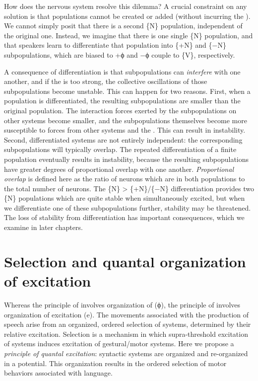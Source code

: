   How does the nervous system resolve this dilemma? A crucial constraint on any solution is that populations cannot be created or added (without incurring the ). We cannot simply posit that there is a second \{N\} population, independent of the original one. Instead, we imagine that there is one single \{N\} population, and that speakers learn to differentiate that population into \{+N\} and \{−N\} subpopulations, which are biased to +ϕ and −ϕ couple to \{V\}, respectively.

  A consequence of differentiation is that subpopulations can \textit{interfere} with one another, and if the  is too strong, the collective oscillations of those subpopulations become unstable. This can happen for two reasons. First, when a population is differentiated, the resulting subpopulations are smaller than the original population. The interaction forces exerted by the subpopulations on other systems become smaller, and the subpopulations themselves become more susceptible to forces from other systems and the . This can result in instability. Second, differentiated systems are not entirely independent: the corresponding subpopulations will typically overlap. The repeated differentiation of a finite population eventually results in instability, because the resulting subpopulations have greater degrees of proportional overlap with one another. \textit{Proportional overlap} is defined here as the ratio of neurons which are in both populations to the total number of neurons. The \{N\} > \{+N\}/\{−N\} differentiation provides two \{N\} populations which are quite stable when simultaneously excited, but when we differentiate one of these subpopulations further, stability may be threatened. The loss of stability from differentiation has important consequences, which we examine in later chapters.

\section{Selection and quantal organization of excitation}

Whereas the principle of  involves organization of  (ϕ), the principle of  involves organization of excitation (e). The movements associated with the production of speech arise from an organized, ordered selection of systems, determined by their relative excitation. Selection is a mechanism in which supra-threshold excitation of systems induces excitation of gestural/motor systems. Here we propose a \textit{principle of quantal excitation}: syntactic systems are organized and re-organized in a  potential. This organization results in the ordered selection of motor behaviors associated with language.

